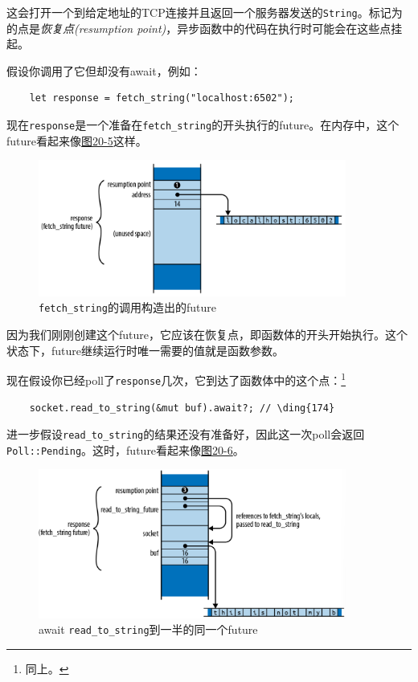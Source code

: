 这会打开一个到给定地址的TCP连接并且返回一个服务器发送的\texttt{String}。标记为的点是\emph{恢复点(resumption point)}，异步函数中的代码在执行时可能会在这些点挂起。

假设你调用了它但却没有await，例如：
\begin{verbatim}
    let response = fetch_string("localhost:6502");
\end{verbatim}

现在\texttt{response}是一个准备在\texttt{fetch\_string}的开头执行的future。在内存中，这个future看起来像\hyperref[f20-5]{图20-5}这样。

\begin{figure}[htbp]
    \centering
    \includegraphics[width=0.9\textwidth]{../img/f20-5.png}
    \caption{\texttt{fetch\_string}的调用构造出的future}
    \label{f20-5}
\end{figure}

因为我们刚刚创建这个future，它应该在恢复点，即函数体的开头开始执行。这个状态下，future继续运行时唯一需要的值就是函数参数。

现在假设你已经poll了\texttt{response}几次，它到达了函数体中的这个点：\footnote{同上。}
\begin{verbatim}
    socket.read_to_string(&mut buf).await?; // \ding{174}
\end{verbatim}

进一步假设\texttt{read\_to\_string}的结果还没有准备好，因此这一次poll会返回\texttt{Poll::Pending}。这时，future看起来像\hyperref[f20-6]{图20-6}。

\begin{figure}[htbp]
    \centering
    \includegraphics[width=0.9\textwidth]{../img/f20-6.png}
    \caption{await \texttt{read\_to\_string}到一半的同一个future}
    \label{f20-6}
\end{figure}

